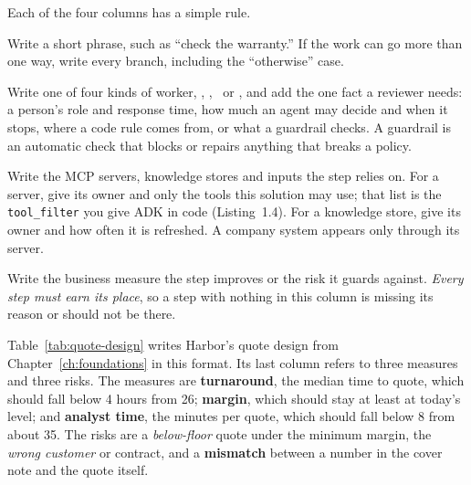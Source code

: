 Each of the four columns has a simple rule.
\begin{description}[leftmargin=1em,itemsep=2pt]
  \item[Step.] Write a short phrase, such as ``check the warranty.'' If the work can go more than one way, write every branch, including the ``otherwise'' case.
  \item[Done by.] Write one of four kinds of worker, \tagPerson, \tagAgent, \tagCode\ or \tagGuardrail, and add the one fact a reviewer needs: a person's role and response time, how much an agent may decide and when it stops, where a code rule comes from, or what a guardrail checks. A guardrail is an automatic check that blocks or repairs anything that breaks a policy.
  \item[Uses.] Write the MCP servers, knowledge stores and inputs the step relies on. For a server, give its owner and only the tools this solution may use; that list is the \texttt{tool\_filter} you give ADK in code (Listing~1.4). For a knowledge store, give its owner and how often it is refreshed. A company system appears only through its server.
  \item[Why it is there.] Write the business measure the step improves or the risk it guards against. \emph{Every step must earn its place}, so a step with nothing in this column is missing its reason or should not be there.
\end{description}

Table~\ref{tab:quote-design} writes Harbor's quote design from Chapter~\ref{ch:foundations} in this format. Its last column refers to three measures and three risks. The measures are \textbf{turnaround}, the median time to quote, which should fall below 4 hours from 26; \textbf{margin}, which should stay at least at today's level; and \textbf{analyst time}, the minutes per quote, which should fall below 8 from about 35. The risks are a \emph{below-floor} quote under the minimum margin, the \emph{wrong customer} or contract, and a \textbf{mismatch} between a number in the cover note and the quote itself.

